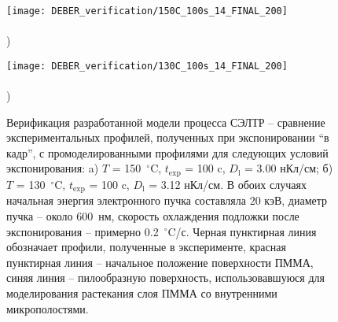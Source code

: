 \begin{figure}[h]
	\begin{minipage}{0.48\textwidth}
		\texttt{[image: DEBER\_verification/150C\_100s\_14\_FINAL\_200]} \\
		\vspace{-12em} \\ ) \\ \vspace{12em}
	\end{minipage}
	\begin{minipage}{0.48\textwidth}
		\texttt{[image: DEBER\_verification/130C\_100s\_14\_FINAL\_200]} \\
		\vspace{-12em} \\ ) \\ \vspace{12em}
	\end{minipage}
	\vspace{-3.5em}
	\caption{Верификация разработанной модели процесса СЭЛТР -- сравнение экспериментальных профилей, полученных при экспонировании ``в кадр'', с промоделированными профилями для следующих условий экспонирования: \linebreak a) $T$ = 150~$^\circ$C, $t_\mathrm{exp}$ = 100 c, $D_\mathrm{l}$ = 3.00 нКл/см; б) $T$ = 130~$^\circ$C, $t_\mathrm{exp}$ = 100 c, \linebreak $D_\mathrm{l}$ = 3.12 нКл/см.  В обоих случаях начальная энергия электронного пучка составляла 20 кэВ, диаметр пучка -- около 600~нм, скорость охлаждения подложки после экспонирования -- примерно 0.2~$^\circ$C/с. Черная пунктирная линия обозначает профили, полученные в эксперименте, красная пунктирная линия -- начальное положение поверхности ПММА, синяя линия -- пилообразную поверхность, использовавшуюся для моделирования растекания слоя ПММА со внутренними микрополостями.}
	\label{fig:DEBER_2_profiles}
\end{figure}

